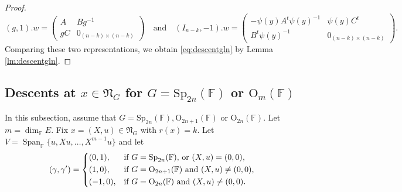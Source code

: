 \documentclass[12pt]{amsart}
\theoremstyle{definition}
\theoremstyle{remark}\newtheorem{rmk}[lm]{Remark}
\newcommand{\RO}{{\mathrm {O}}}
\newcommand{\Sp}{{\mathrm{Sp}}}
\newcommand{\Span}{\operatorname{Span}}
\newcommand{\gC}{{\mathfrak g}_{\C}}
\newcommand{\fN}{\mathfrak N}
\newcommand{\C}{\mathbb{F}}
\newcommand{\B}{\mathbf{B}}
\begin{document}
\begin{proof}
\begin{equation*}
    		(g,1).w=\left(\begin{matrix}
    			A&Bg^{-1}\\gC&0_{(n-k)\times(n-k)}
    		\end{matrix}\right)\quad\text{and}\quad(I_{n-k},-1).w=\left(\begin{matrix}
    		-\psi(y)A^t\psi(y)^{-1}&\psi(y)C^t\\B^t\psi(y)^{-1}&0_{(n-k)\times(n-k)}
    		\end{matrix}\right).
    	\end{equation*}
    	Comparing these two representations, we obtain \eqref{eq:descentgln} by Lemma \ref{lm:descentgln}.
    \end{proof}
    
    \subsection{Descents at $x\in\fN_{G}$ for $G=\Sp_{2n}(\C)$ or $\RO_m(\C)$}
    In this subsection, assume that $G=\Sp_{2n}(\C),\RO_{2n+1}(\C)$ or $\RO_{2n}(\C)$. Let $m=\dim_{\C}E$. Fix $x=(X,u)\in\fN_{G}$ with $r(x)=k$. Let $V=\Span_{\C}\{u,Xu,\dots,X^{m-1}u\}$ and let
    \begin{equation*}
    	(\gamma,\gamma')=\begin{cases*}
    		(0,1),&if $G=\Sp_{2n}(\C)$, or $(X,u)=(0,0)$,\\
    		(1,0),&if $G=\RO_{2n+1}(\C)$ and $(X,u)\neq(0,0)$,\\
    		(-1,0),&if $G=\RO_{2n}(\C)$ and $(X,u)\neq(0,0)$.
    	\end{cases*}
    \end{equation*}
    
\end{document}
